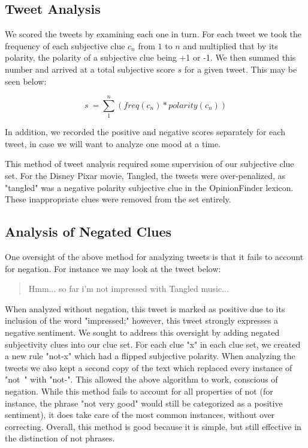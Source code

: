 \documentclass[11pt]{article}
\begin{document}
\subsection{Tweet Analysis}
We scored the tweets by examining each one in turn. For each tweet we took the frequency of each subjective clue $c_{n}$ from $1$ to $n$ and multiplied that by its polarity, the polarity of a subjective clue being +1 or -1. We then summed this number and arrived at a total subjective score $s$ for a given tweet. This may be seen below:

\begin{equation}
s\ = \sum_{1}^{n}(freq(c_{n})*polarity(c_{n}))
\end{equation}

In addition, we recorded the positive and negative scores separately for each tweet, in case we will want to analyze one mood at a time.

This method of tweet analysis required some supervision of our subjective clue set. For the Disney Pixar movie, Tangled, the tweets were over-penalized, as "tangled" was a negative polarity subjective clue in the OpinionFinder lexicon. These inappropriate clues were removed from the set entirely.

\subsection{Analysis of Negated Clues}
One oversight of the above method for analyzing tweets is that it fails to account for negation. For instance we may look at the tweet below:

\begin{quote}
Hmm... so far i'm not impressed with Tangled music...
\end{quote}

When analyzed without negation, this tweet is marked as positive due to its inclusion of the word "impressed;" however, this tweet strongly expresses a negative sentiment. We sought to address this oversight by adding negated subjectivity clues into our clue set. For each clue "x" in each clue set, we created a new rule "not-x" which had a flipped subjective polarity. When analyzing the tweets we also kept a second copy of the text which replaced every instance of "not\ " with "not-". This allowed the above algorithm to work, conscious of negation. While this method fails to account for all properties of not (for instance, the phrase "not very good" would still be categorized as a positive sentiment), it does take care of the most common instances, without over correcting.  Overall, this method is good because it is simple, but still effective in the distinction of not phrases.
\end{document}
